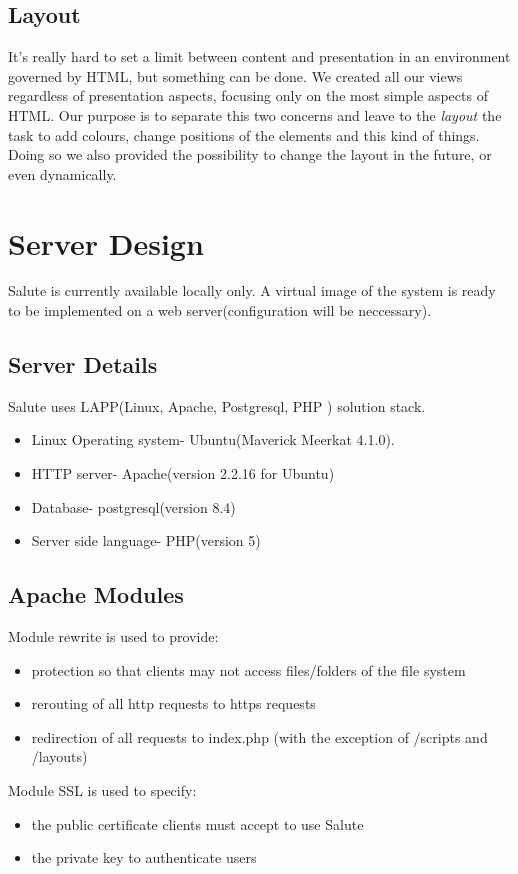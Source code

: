 \documentclass[12pt]{report}
\begin{document}
\subsection{Layout}
It's really hard to set a limit between content and presentation in an environment governed by HTML, but something can be done. We created all our views regardless of presentation aspects, focusing only on the most simple aspects of HTML. Our purpose is to separate this two concerns and leave to the \emph{layout} the task to add colours, change positions of the elements and this kind of things. Doing so we also provided the possibility to change the layout in the future, or even dynamically.

\section{Server Design}
Salute is currently available locally only. A virtual image of the system is ready to be implemented on a web server(configuration will be neccessary).

\subsection{Server Details}
Salute uses LAPP(Linux, Apache, Postgresql, PHP ) solution stack.
\begin{itemize}
\item Linux Operating system- Ubuntu(Maverick Meerkat 4.1.0). 
\item HTTP server- Apache(version 2.2.16 for Ubuntu)
\item Database- postgresql(version 8.4)
\item Server side language- PHP(version 5)
\end{itemize}

\subsection{Apache Modules}
Module rewrite is used to provide:
\begin{itemize}
\item protection so that clients may not access files/folders of the file system
\item rerouting of all http requests to https requests
\item redirection of all requests to index.php (with the exception of /scripts and /layouts)
\end{itemize}
Module SSL is used to specify:
\begin{itemize}
\item the public certificate clients must accept to use Salute
\item the private key to authenticate users
\end{itemize}
\end{document}
